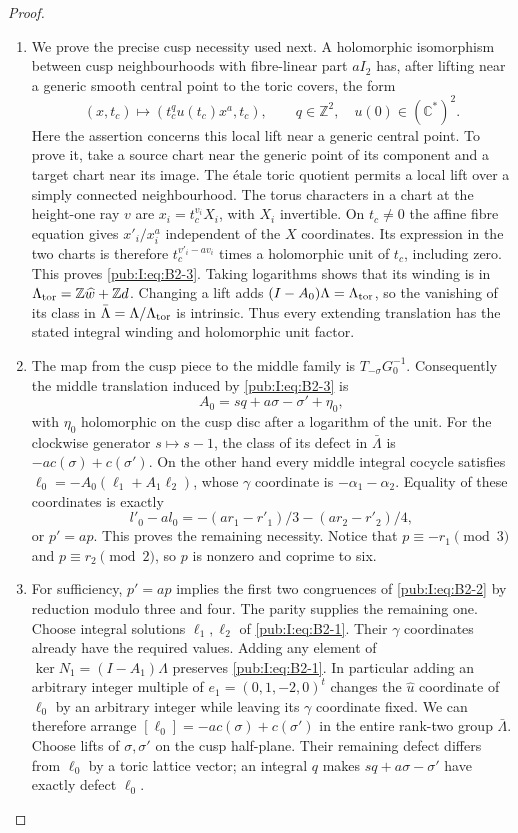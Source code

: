 \begin{proof}
\begin{enumerate}[label=\arabic*.,leftmargin=*]
\item We prove the precise cusp necessity used next. A holomorphic isomorphism between cusp neighbourhoods with fibre-linear part $aI_2$ has, after lifting near a generic smooth central point to the toric covers, the form
\begin{equation}
 (x,t_c)\longmapsto(t_c^q u(t_c)x^a,t_c),\qquad q\in\mathbb Z^2,
 \quad u(0)\in(\mathbb C^*)^2.
\label{pub:I:eq:B2-3}
\end{equation}
Here the assertion concerns this local lift near a generic central point. To prove it, take a source chart near the generic point of its component and a target chart near its image. The \'etale toric quotient permits a local lift over a simply connected neighbourhood. The torus characters in a chart at the height-one ray $v$ are $x_i=t_c^{v_i}X_i$, with $X_i$ invertible. On $t_c\ne0$ the affine fibre equation gives $x'_i/x_i^a$ independent of the $X$ coordinates. Its expression in the two charts is therefore $t_c^{v'_i-av_i}$ times a holomorphic unit of $t_c$, including zero. This proves \eqref{pub:I:eq:B2-3}. Taking logarithms shows that its winding is in $\Lambda_{\rm tor}=\mathbb Z\widehat w+\mathbb Zd$. Changing a lift adds $(I-A_0)\Lambda=\Lambda_{\rm tor}$, so the vanishing of its class in $\bar\Lambda=\Lambda/\Lambda_{\rm tor}$ is intrinsic. Thus every extending translation has the stated integral winding and holomorphic unit factor.

\item The map from the cusp piece to the middle family is $T_{-\sigma}G_0^{-1}$. Consequently the middle translation induced by \eqref{pub:I:eq:B2-3} is
\[
 A_0=sq+a\sigma-\sigma'+\eta_0,
\]
with $\eta_0$ holomorphic on the cusp disc after a logarithm of the unit. For the clockwise generator $s\mapsto s-1$, the class of its defect in $\bar\Lambda$ is $-a c(\sigma)+c(\sigma')$. On the other hand every middle integral cocycle satisfies
$\ell_0=-A_0(\ell_1+A_1\ell_2)$, whose $\gamma$ coordinate is $-\alpha_1-\alpha_2$. Equality of these coordinates is exactly
\[
 l'_0-a l_0=-(ar_1-r'_1)/3-(ar_2-r'_2)/4,
\]
or $p'=ap$. This proves the remaining necessity. Notice that $p\equiv-r_1\pmod3$ and $p\equiv r_2\pmod2$, so $p$ is nonzero and coprime to six.

\item For sufficiency, $p'=ap$ implies the first two congruences of \eqref{pub:I:eq:B2-2} by reduction modulo three and four. The parity supplies the remaining one. Choose integral solutions $\ell_1,\ell_2$ of \eqref{pub:I:eq:B2-1}. Their $\gamma$ coordinates already have the required values. Adding any element of $\ker N_1=(I-A_1)\Lambda$ preserves \eqref{pub:I:eq:B2-1}. In particular adding an arbitrary integer multiple of $e_1=(0,1,-2,0)^t$ changes the $\widehat u$ coordinate of $\ell_0$ by an arbitrary integer while leaving its $\gamma$ coordinate fixed. We can therefore arrange
$[\ell_0]=-a c(\sigma)+c(\sigma')$ in the entire rank-two group $\bar\Lambda$. Choose lifts of $\sigma,\sigma'$ on the cusp half-plane. Their remaining defect differs from $\ell_0$ by a toric lattice vector; an integral $q$ makes $sq+a\sigma-\sigma'$ have exactly defect $\ell_0$.


\end{enumerate}
\end{proof}
